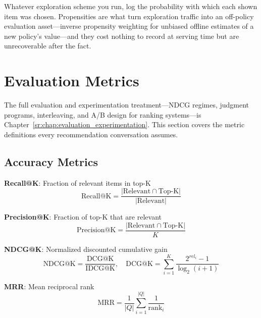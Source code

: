 \begin{keyinsight}
Whatever exploration scheme you run, log the probability with which each shown item was chosen. Propensities are what turn exploration traffic into an off-policy evaluation asset---inverse propensity weighting for unbiased offline estimates of a new policy's value---and they cost nothing to record at serving time but are unrecoverable after the fact.
\end{keyinsight}

\section{Evaluation Metrics}
\label{sr:sec:recsys_metrics}

The full evaluation and experimentation treatment---NDCG regimes, judgment programs, interleaving, and A/B design for ranking systems---is Chapter~\ref{sr:chap:evaluation_experimentation}. This section covers the metric definitions every recommendation conversation assumes.

\subsection{Accuracy Metrics}

\textbf{Recall@K}: Fraction of relevant items in top-K
\begin{equation}
\text{Recall@K} = \frac{|\text{Relevant} \cap \text{Top-K}|}{|\text{Relevant}|}
\end{equation}

\textbf{Precision@K}: Fraction of top-K that are relevant
\begin{equation}
\text{Precision@K} = \frac{|\text{Relevant} \cap \text{Top-K}|}{K}
\end{equation}

\textbf{NDCG@K}: Normalized discounted cumulative gain
\begin{equation}
\text{NDCG@K} = \frac{\text{DCG@K}}{\text{IDCG@K}}, \quad \text{DCG@K} = \sum_{i=1}^{K} \frac{2^{rel_i} - 1}{\log_2(i+1)}
\end{equation}

\textbf{MRR}: Mean reciprocal rank
\begin{equation}
\text{MRR} = \frac{1}{|Q|} \sum_{i=1}^{|Q|} \frac{1}{\text{rank}_i}
\end{equation}

